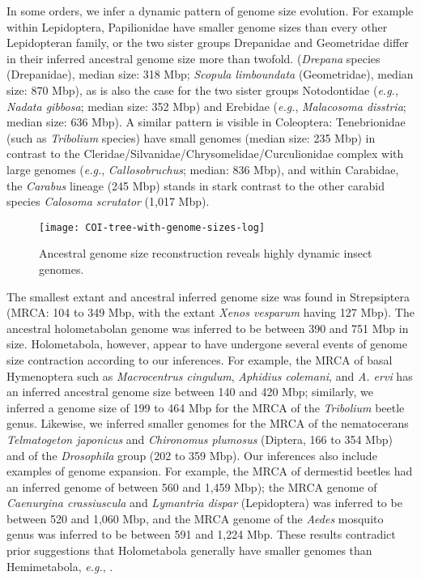 In some orders, we infer a dynamic pattern of genome size evolution. For
example within Lepidoptera, Papilionidae have smaller genome sizes than
every other Lepidopteran family, or the two sister groups Drepanidae and
Geometridae differ in their inferred ancestral genome size more than
twofold. (\emph{Drepana} species (Drepanidae), median size: 318 Mbp;
\emph{Scopula limboundata} (Geometridae), median size: 870 Mbp), as is
also the case for the two sister groups Notodontidae (\emph{e.g.},
\emph{Nadata gibbosa}; median size: 352 Mbp) and Erebidae (\emph{e.g.},
\emph{Malacosoma disstria}; median size: 636 Mbp). A similar pattern is
visible in Coleoptera: Tenebrionidae (such as \emph{Tribolium} species)
have small genomes (median size: 235 Mbp) in contrast to the
Cleridae/Silvanidae/Chrysomelidae/Curculionidae complex with large
genomes (\emph{e.g.}, \emph{Callosobruchus}; median: 836 Mbp), and
within Carabidae, the \emph{Carabus} lineage (245 Mbp) stands in stark
contrast to the other carabid species \emph{Calosoma scrutator} (1,017
Mbp).

\begin{figure}[h!]
\begin{center}
\texttt{[image: COI-tree-with-genome-sizes-log]}
\caption[Ancestral genome size reconstruction reveals highly dynamic insect
genomes]{{Ancestral genome size reconstruction reveals highly dynamic insect
genomes.
{\label{fig:ancestral-sizes}}%
}}
\end{center}
\end{figure}

The smallest extant and ancestral inferred genome size was found in
Strepsiptera (MRCA: 104 to 349 Mbp, with the extant \emph{Xenos
vesparum} having 127 Mbp). The ancestral holometabolan genome was
inferred to be between 390 and 751 Mbp in size. Holometabola, however,
appear to have undergone several events of genome size contraction
according to our inferences. For example, the MRCA of basal Hymenoptera
such as \emph{Macrocentrus cingulum}, \emph{Aphidius colemani}, and
\emph{A. ervi} has an inferred ancestral genome size between 140 and 420
Mbp; similarly, we inferred a genome size of 199 to 464 Mbp for the MRCA
of the \emph{Tribolium} beetle genus. Likewise, we inferred smaller
genomes for the MRCA of the nematocerans \emph{Telmatogeton japonicus}
and \emph{Chironomus plumosus} (Diptera, 166 to 354 Mbp) and of the
\emph{Drosophila} group (202 to 359 Mbp). Our inferences also include
examples of genome expansion. For example, the MRCA of dermestid beetles
had an inferred genome of between 560 and 1,459 Mbp); the MRCA genome of
\emph{Caenurgina crassiuscula} and \emph{Lymantria dispar} (Lepidoptera)
was inferred to be between 520 and 1,060 Mbp, and the MRCA genome of the
\emph{Aedes} mosquito genus was inferred to be between 591 and 1,224
Mbp. These results contradict prior suggestions that Holometabola
generally have smaller genomes than Hemimetabola, \emph{e.g.},
\citep{Hanrahan2011}.

